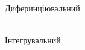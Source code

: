 \begin{figure}[h]
    \begin{minipage}[h]{0.47\linewidth}
         \\Диферинціювальний
    \end{minipage}
    \hfill
    \begin{minipage}[h]{0.47\linewidth}
         \\Інтегрувальний

\end{minipage}
\end{figure}
